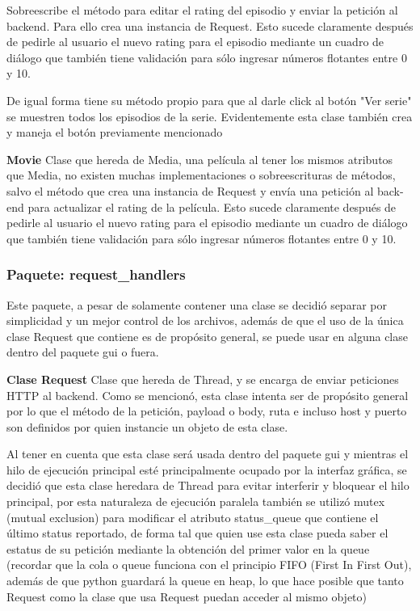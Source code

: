 Sobreescribe el método  para editar el rating del episodio y enviar la petición al backend. Para ello crea una instancia de Request. Esto sucede claramente después de pedirle al usuario el nuevo rating para el episodio mediante un cuadro de diálogo que también tiene validación para sólo ingresar números flotantes entre 0 y 10.

De igual forma tiene su método propio  para que al darle click al botón "Ver serie" se muestren todos los episodios de la serie. Evidentemente esta clase también crea y maneja el botón previamente mencionado

\textbf{Movie}\newline
Clase que hereda de Media, una película al tener los mismos atributos que Media, no existen muchas implementaciones o sobreescrituras de métodos, salvo el método  que crea una instancia de Request y envía una petición al back-end para actualizar el rating de la película. Esto sucede claramente después de pedirle al usuario el nuevo rating para el episodio mediante un cuadro de diálogo que también tiene validación para sólo ingresar números flotantes entre 0 y 10.

\subsubsection{Paquete: request\_handlers}
Este paquete, a pesar de solamente contener una clase se decidió separar por simplicidad y un mejor control de los archivos, además de que el uso de la única clase Request que contiene es de propósito general, se puede usar en alguna clase dentro del paquete gui o fuera.

\textbf{Clase Request}\newline
Clase que hereda de Thread, y se encarga de enviar peticiones HTTP al backend. Como se mencionó, esta clase intenta ser de propósito general por lo que el método de la petición, payload o body, ruta e incluso host y puerto son definidos por quien instancie un objeto de esta clase.

Al tener en cuenta que esta clase será usada dentro del paquete gui y mientras el hilo de ejecución principal esté principalmente ocupado por la interfaz gráfica, se decidió que esta clase heredara de Thread para evitar interferir y bloquear el hilo principal, por esta naturaleza de ejecución paralela también se utilizó mutex (mutual exclusion) para modificar el atributo status\_queue que contiene el último status reportado, de forma tal que quien use esta clase pueda saber el estatus de su petición mediante la obtención del primer valor en la queue (recordar que la cola o queue funciona con el principio FIFO (First In First Out), además de que python guardará la queue en heap, lo que hace posible que tanto Request como la clase que usa Request puedan acceder al mismo objeto)


